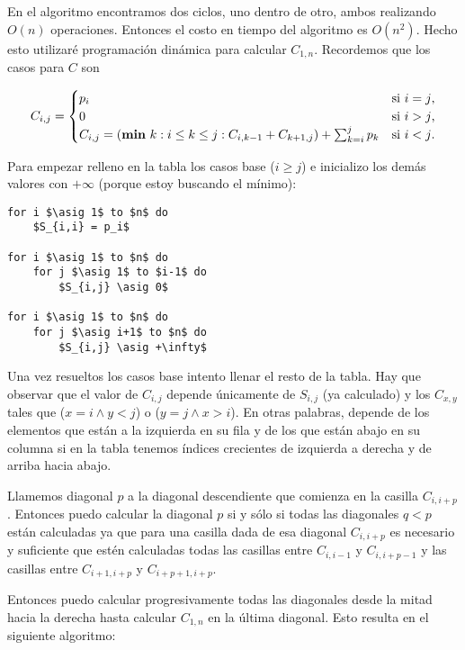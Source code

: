 \documentclass{article}
\newcommand{\asig}{\ensuremath{\leftarrow}}
\begin{document}
En el algoritmo encontramos dos ciclos, uno dentro de otro, ambos realizando $O(n)$ operaciones. Entonces
el costo en tiempo del algoritmo es $O(n^2)$. Hecho esto utilizaré programación dinámica para calcular
$C_{1,n}$. Recordemos que los casos para $C$ son

\begin{equation*}
C_{i,j} = 
\begin{cases}
p_i & \text{si $i=j$,} \\
0 &\text{si $i>j$,} \\
C_{i,j} = (\text{{\bf min} } k : i \leq k \leq j : C_{i,k-1} + C_{k+1,j}) + \sum_{k=i}^j p_k &\text{si $i<j$.} \\
\end{cases}
\end{equation*}

Para empezar relleno en la tabla los casos base ($i \geq j$) e inicializo los demás valores
con $+\infty$ (porque estoy buscando el mínimo):

\begin{lstlisting}[caption={Inicialización de casos base de la tabla C},label=alg:tablaC_base]
for i $\asig 1$ to $n$ do
    $S_{i,i} = p_i$

for i $\asig 1$ to $n$ do
    for j $\asig 1$ to $i-1$ do
        $S_{i,j} \asig 0$

for i $\asig 1$ to $n$ do
    for j $\asig i+1$ to $n$ do
        $S_{i,j} \asig +\infty$
\end{lstlisting}

Una vez resueltos los
casos base intento llenar el resto de la tabla. Hay que observar que el valor de $C_{i,j}$
depende únicamente de $S_{i,j}$ (ya calculado) y los $C_{x,y}$ tales que ($x=i \wedge y<j$) o
($y=j \wedge x>i$). En otras palabras, depende de los elementos que están a la izquierda en su
fila y de los que están abajo en su columna si en la tabla tenemos índices crecientes de izquierda
a derecha y de arriba hacia abajo.

Llamemos diagonal $p$ a la diagonal descendiente que comienza en la casilla $C_{i,i+p}$. Entonces
puedo calcular la diagonal $p$ si y sólo si todas las diagonales $q < p$ están calculadas
ya que para una casilla
dada de esa diagonal $C_{i,i+p}$ es necesario y suficiente que estén calculadas todas las casillas
entre $C_{i,i-1}$ y $C_{i,i+p-1}$ y las casillas entre $C_{i+1,i+p}$ y $C_{i+p+1,i+p}$.

Entonces puedo calcular progresivamente todas las diagonales desde la mitad
hacia la derecha hasta calcular $C_{1,n}$ en la última diagonal. Esto resulta en
el siguiente algoritmo:
\end{document}
